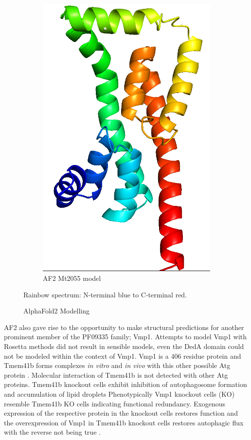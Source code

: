 \begin{figure}[htb]
\begin{subfigure}{0.25\textwidth}
  \includegraphics[width=\linewidth]{Results/w9_af.png}
  \caption{AF2 Mt2055 model}
  \label{fig:w9_af}
\end{subfigure}\hfil %
\caption{AlphaFold2 Modelling}
\small
Rainbow spectrum: N-terminal blue to C-terminal red.
\label{fig:af2_modelling}
\end{figure}


AF2 also gave rise to the opportunity to make structural predictions for another prominent member of the PF09335 family; Vmp1.  Attempts to model Vmp1 with Rosetta methods did not result in sensible models, even the DedA domain could not be modeled within the context of Vmp1.  Vmp1 is a 406 residue protein and Tmem41b forms complexes \emph{in vitro} and \emph{in vivo} with this other possible Atg protein \cite{Mizushima2011}. Molecular interaction of
Tmem41b is not detected with other Atg proteins. Tmem41b knockout cells exhibit inhibition of autophagosome formation and accumulation of lipid droplets \cite{Moretti2018} \cite{morita2018genome} Phenotypically Vmp1 knockout cells (KO) resemble Tmem41b KO cells indicating functional redundancy. Exogenous expression of the respective protein in the knockout cells restores function and the overexpression of Vmp1 in Tmem41b knockout cells restores autophagic flux with the reverse not being true \cite{Moretti2018}.

